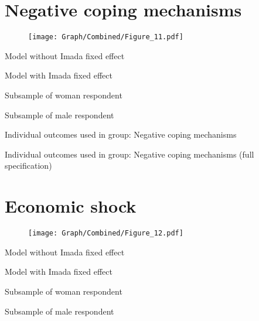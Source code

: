 \documentclass[10pt,a4paper]{article}
\begin{document}
\section{Negative coping mechanisms}
\begin{table}[H]\centering

\end{table}
\begin{figure}[H]\centering
\texttt{[image: Graph/Combined/Figure\_11.pdf]}
\caption{} \label{fig:Fig_11}
\end{figure}
\begin{table}[H]\centering\caption{Model without Imada fixed effect}

\end{table}
\begin{table}[H]\centering\caption{Model with Imada fixed effect}

\end{table}
\begin{table}[H]\centering\caption{Subsample of woman respondent}

\end{table}
\begin{table}[H]\centering\caption{Subsample of male respondent}

\end{table}

\begin{table}[H]\centering\caption{Individual outcomes used in group: Negative coping mechanisms }
\resizebox{\textwidth}{!}{}
\end{table}
\begin{table}[H]\centering\caption{Individual outcomes used in group: Negative coping mechanisms (full specification)}
\resizebox{\textwidth}{!}{}
\end{table}
\pagebreak
\section{Economic shock}
\begin{table}[H]\centering

\end{table}
\begin{figure}[H]\centering
\texttt{[image: Graph/Combined/Figure\_12.pdf]}
\caption{} \label{fig:Fig_12}
\end{figure}
\begin{table}[H]\centering\caption{Model without Imada fixed effect}

\end{table}
\begin{table}[H]\centering\caption{Model with Imada fixed effect}

\end{table}
\begin{table}[H]\centering\caption{Subsample of woman respondent}

\end{table}
\begin{table}[H]\centering\caption{Subsample of male respondent}

\end{table}
\end{document}
